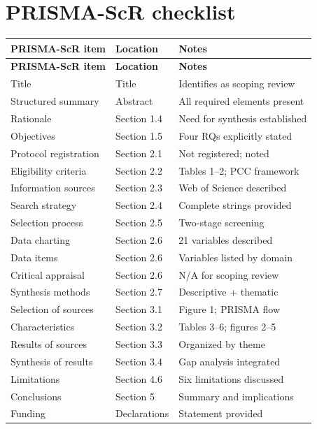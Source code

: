 \documentclass[ed]{acnsart}
\begin{document}


\appendix


\section{PRISMA-ScR checklist}
\label{app:prisma}

\small
\begin{longtable}{@{}lll@{}}
\toprule
\hfill\textbf{PRISMA-ScR item} & \hfill\textbf{Location} & \hfill\textbf{Notes} \\
\midrule
\endfirsthead
\midrule
\hfil \textbf{PRISMA-ScR item} & \textbf{Location} & \textbf{Notes} \\
\midrule
\endhead
\bottomrule
\endfoot
Title & Title & Identifies as scoping review \\
Structured summary & Abstract & All required elements present \\
Rationale & Section 1.4 & Need for synthesis established \\
Objectives & Section 1.5 & Four RQs explicitly stated \\
Protocol registration & Section 2.1 & Not registered; noted \\
Eligibility criteria & Section 2.2 & Tables 1--2; PCC framework \\
Information sources & Section 2.3 & Web of Science described \\
Search strategy & Section 2.4 & Complete strings provided \\
Selection process & Section 2.5 & Two-stage screening \\
Data charting & Section 2.6 & 21 variables described \\
Data items & Section 2.6 & Variables listed by domain \\
Critical appraisal & Section 2.6 & N/A for scoping review \\
Synthesis methods & Section 2.7 & Descriptive + thematic \\
Selection of sources & Section 3.1 & Figure 1; PRISMA flow \\
Characteristics & Section 3.2 & Tables 3--6; figures 2--5 \\
Results of sources & Section 3.3 & Organized by theme \\
Synthesis of results & Section 3.4 & Gap analysis integrated \\
Limitations & Section 4.6 & Six limitations discussed \\
Conclusions & Section 5 & Summary and implications \\
Funding & Declarations & Statement provided \\
\end{longtable}

\end{document}
